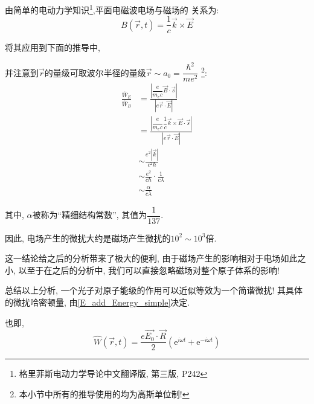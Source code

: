 \documentclass[a4paper, 11pt]{article}
\begin{document}
\begin{spacing}{1.2}
          由简单的电动力学知识\footnote{格里菲斯电动力学导论中文翻译版, 第三版, P242},平面电磁波电场与磁场的 
          关系为:
          \begin{equation}
            B(\vec{r}, t) = \frac{1}{c}\vec{k} \times \vec{E}
          \end{equation}

          将其应用到下面的推导中, 
          
          并注意到$\vec{r}$的量级可取波尔半径的量级$\vec{r}\sim{}a_0 = \dfrac{\hbar^2}{me^2}$
          \footnote{本小节中所有的推导使用的均为高斯单位制!}:
          \begin{equation}
            \begin{aligned}
              \frac{\hat{W}_E}{\hat{W}_B} &= \frac{|\dfrac{e}{m_ec}\vec{B}\cdot\vec{s}|}
                                                  {|e\vec{r}\cdot\vec{E}|}\\
                                          &= \frac{|\dfrac{e}{m_ec}\dfrac{1}{c}\vec{k}\times\vec{E}\cdot\vec{s}|}
                                                  {|e\vec{r}\cdot\vec{E}|}\\
                                          &\sim \frac{e^2|\vec{k}|}{c^2\hbar}\\
                                          &\sim \frac{e^2}{c\hbar}\cdot \frac{1}{c\lambda}\\
                                          &\sim \frac{\alpha}{c\lambda}
            \end{aligned}
          \end{equation}

          其中, $\alpha$被称为``精细结构常数'', 其值为$\dfrac{1}{137}$.
          
          因此, 电场产生的微扰大约是磁场产生微扰的$10^2\sim 10^3$倍.

          这一结论给之后的分析带来了极大的便利, 由于磁场产生的影响相对于电场如此之小, 以至于在之后的分析中, 
          我们可以直接忽略磁场对整个原子体系的影响!

          总结以上分析, 一个光子对原子能级的作用可以近似等效为一个简谐微扰! 其具体的微扰哈密顿量, 由\eqref{E_add_Energy_simple}决定.

          也即,
          \begin{equation}
            \hat{W}(\vec{r},t) = \dfrac{e\vec{E_0}\cdot\vec{R}}{2}
            (\mathrm{e}^{i\omega{}t}+\mathrm{e}^{-i\omega{}t}) 
          \end{equation}
          

\end{spacing}
\end{document}
